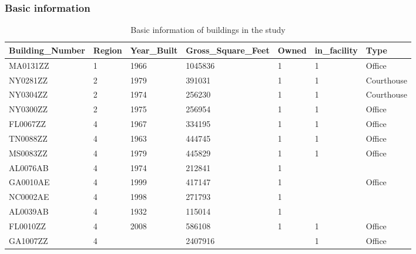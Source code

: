 \documentclass[12pt]{article}
\begin{document}
\subsubsection{Basic information}
\begin{longtable}{lllllll}
\caption{Basic information of buildings in the study}\\
\label{tab:basic_info}
Building\_Number & Region & Year\_Built & Gross\_Square\_Feet & Owned & in\_facility & Type \\ \hline \hline \endhead
MA0131ZZ         & 1      & 1966        & 1045836                    & 1     & 1            & Office                           \\
NY0281ZZ         & 2      & 1979        & 391031                     & 1     & 1            & Courthouse                       \\
NY0304ZZ         & 2      & 1974        & 256230                     & 1     & 1            & Courthouse                       \\
NY0300ZZ         & 2      & 1975        & 256954                     & 1     & 1            & Office                           \\
FL0067ZZ         & 4      & 1967        & 334195                     & 1     & 1            & Office                           \\
TN0088ZZ         & 4      & 1963        & 444745                     & 1     & 1            & Office                           \\
MS0083ZZ         & 4      & 1979        & 445829                     & 1     & 1            & Office                           \\
AL0076AB         & 4      & 1974        & 212841                     & 1     &              &                                  \\
GA0010AE         & 4      & 1999        & 417147                     & 1     &              & Office                           \\
NC0002AE         & 4      & 1998        & 271793                     & 1     &              &                                  \\
AL0039AB         & 4      & 1932        & 115014                     & 1     &              &                                  \\
FL0010ZZ         & 4      & 2008        & 586108                     & 1     & 1            & Office                           \\
GA1007ZZ         & 4      &             & 2407916                    &       & 1            & Office                           \\

\end{longtable}
\end{document}
